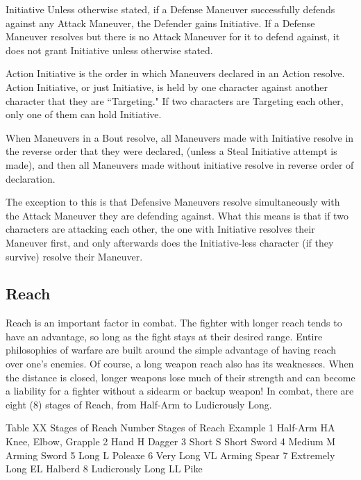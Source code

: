 \documentclass[oneside,11pt,english]{book}
\begin{document}
Initiative
Unless otherwise stated, if a Defense Maneuver successfully defends against any Attack
Maneuver, the Defender gains Initiative. If a Defense Maneuver resolves but there is no Attack
Maneuver for it to defend against, it does not grant Initiative unless otherwise stated.

Action Initiative is the order in which Maneuvers declared in an Action resolve. Action Initiative, or just Initiative, is held by one character against another character that they are
``Targeting." If two characters are Targeting each other, only one of them can hold
Initiative.

When Maneuvers in a Bout resolve, all Maneuvers made with Initiative resolve in the reverse
order that they were declared, (unless a Steal Initiative attempt is made), and then all Maneuvers
made without initiative resolve in reverse order of declaration.

The exception to this is that Defensive Maneuvers resolve simultaneously with the Attack
Maneuver they are defending against. What this means is that if two characters are attacking each
other, the one with Initiative resolves their Maneuver first, and only afterwards does the
Initiative-less character (if they survive) resolve their Maneuver.

\subsection{Reach}\label{sec:Reach} %
Reach is an important factor in combat. The fighter with longer reach tends to have an advantage, so long
as the fight stays at their desired range. Entire philosophies of warfare are built around the simple
advantage of having reach over one’s enemies. Of course, a long weapon reach also has its weaknesses.
When the distance is closed, longer weapons lose much of their strength and can become a liability for a
fighter without a sidearm or backup weapon!
In combat, there are eight (8) stages of Reach, from Half-Arm to Ludicrously Long.

Table XX Stages of Reach
Number
Stages of Reach
Example
1
Half-Arm
HA
Knee, Elbow, Grapple
2
Hand
H
Dagger
3
Short
S
Short Sword
4
Medium
M
Arming Sword
5
Long
L
Poleaxe
6
Very Long
VL
Arming Spear
7
Extremely Long
EL
Halberd
8
Ludicrously Long
LL
Pike
\end{document}
